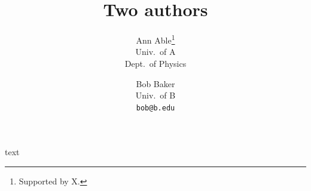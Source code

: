 \documentclass{article}
\begin{document}
\title{Two authors}
\author{Ann Able\thanks{Supported by X.} \\ Univ.\ of A \\ Dept.\ of Physics
\and Bob Baker \\ Univ.\ of B \\ \texttt{bob@b.edu}}
\date{}
\maketitle
text
\end{document}
